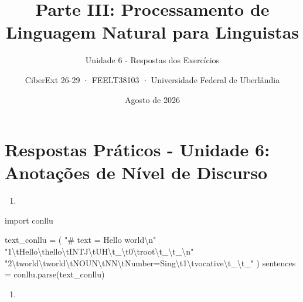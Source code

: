 \documentclass[
  brazilian,
]{article}
\title{Parte III: Processamento de Linguagem Natural para Linguistas}
\subtitle{Unidade 6 - Respostas dos Exercícios}
\author{CiberExt 26-29 · FEELT38103 · Universidade Federal de
Uberlândia}
\date{Agosto de 2026}
\newenvironment{Shaded}{}{}
\newcommand{\CharTok}[1]{\textcolor[rgb]{0.25,0.44,0.63}{#1}}
\newcommand{\ImportTok}[1]{#1}
\newcommand{\NormalTok}[1]{#1}
\newcommand{\OperatorTok}[1]{\textcolor[rgb]{0.40,0.40,0.40}{#1}}
\newcommand{\StringTok}[1]{\textcolor[rgb]{0.25,0.44,0.63}{#1}}
\providecommand{\tightlist}{%
  \setlength{\itemsep}{0pt}\setlength{\parskip}{0pt}}
\begin{document}
\maketitle

\hypertarget{respostas-pruxe1ticos---unidade-6-anotauxe7uxf5es-de-nuxedvel-de-discurso}{%
\section{Respostas Práticos - Unidade 6: Anotações de Nível de
Discurso}\label{respostas-pruxe1ticos---unidade-6-anotauxe7uxf5es-de-nuxedvel-de-discurso}}

\begin{enumerate}
\def\labelenumi{\arabic{enumi}.}
\tightlist
\item
\end{enumerate}

\begin{Shaded}
\begin{Highlighting}[]
\ImportTok{import}\NormalTok{ conllu}

\NormalTok{text\_conllu }\OperatorTok{=}\NormalTok{ (}
    \StringTok{"\# text = Hello world}\CharTok{\textbackslash{}n}\StringTok{"}
    \StringTok{"1}\CharTok{\textbackslash{}t}\StringTok{Hello}\CharTok{\textbackslash{}t}\StringTok{hello}\CharTok{\textbackslash{}t}\StringTok{INTJ}\CharTok{\textbackslash{}t}\StringTok{UH}\CharTok{\textbackslash{}t}\StringTok{\_}\CharTok{\textbackslash{}t}\StringTok{0}\CharTok{\textbackslash{}t}\StringTok{root}\CharTok{\textbackslash{}t}\StringTok{\_}\CharTok{\textbackslash{}t}\StringTok{\_}\CharTok{\textbackslash{}n}\StringTok{"}
    \StringTok{"2}\CharTok{\textbackslash{}t}\StringTok{world}\CharTok{\textbackslash{}t}\StringTok{world}\CharTok{\textbackslash{}t}\StringTok{NOUN}\CharTok{\textbackslash{}t}\StringTok{NN}\CharTok{\textbackslash{}t}\StringTok{Number=Sing}\CharTok{\textbackslash{}t}\StringTok{1}\CharTok{\textbackslash{}t}\StringTok{vocative}\CharTok{\textbackslash{}t}\StringTok{\_}\CharTok{\textbackslash{}t}\StringTok{\_"}
\NormalTok{)}
\NormalTok{sentences }\OperatorTok{=}\NormalTok{ conllu.parse(text\_conllu)}
\end{Highlighting}
\end{Shaded}

\begin{enumerate}
\def\labelenumi{\arabic{enumi}.}
\setcounter{enumi}{1}
\tightlist
\item
\end{enumerate}
\end{document}
